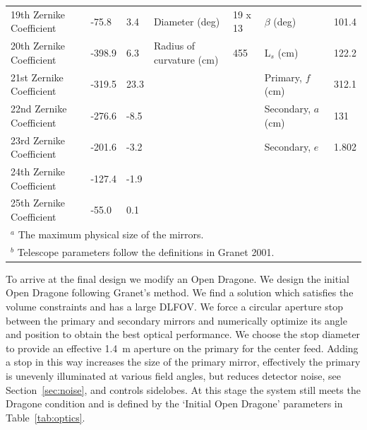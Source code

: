 \documentclass[]{spie}  %
\begin{document}
\begin{table}[ht]
\begin{adjustbox}{width=1.05\textwidth}
\begin{tabular}{|l|llll||ll|}
19th Zernike Coefficient  & -75.8             & 3.4               & Diameter (deg)            & 19 x 13  & $\beta$  (deg)                 & 101.4 \\   
20th Zernike Coefficient  & -398.9            & 6.3               & Radius of curvature (cm)  & 455      & L$_s$ (cm)                     & 122.2 \\   
21st Zernike Coefficient  & -319.5            & 23.3              &                           &          & Primary, $f$ (cm)              & 312.1 \\   
22nd Zernike Coefficient  & -276.6            & -8.5              &                           &          & Secondary, $a$ (cm)            & 131   \\   
23rd Zernike Coefficient  & -201.6            & -3.2              &                           &          & Secondary, $e$                 &  1.802  \\
24th Zernike Coefficient  & -127.4            & -1.9              &                           &          &                                &       \\
25th Zernike Coefficient  & -55.0             & 0.1               &                           &          &                                &       \\\hline
\multicolumn{7}{l}{\footnotesize  $^a$ The maximum physical size of the mirrors.}\\
\multicolumn{7}{l}{\footnotesize  $^b$ Telescope parameters follow the definitions in Granet 2001.\cite{granet2001}} \\
\end{tabular}
\end{adjustbox}
\end{table}

To arrive at the final design we modify an Open Dragone.  We design the initial Open Dragone following Granet's method\cite{granet2001}. 
We find a solution which satisfies the volume constraints and has a large DLFOV.  We force a circular aperture stop 
between the primary and secondary mirrors and numerically optimize its angle and position to obtain the best 
optical performance.  We choose the stop diameter to provide an effective 1.4~m aperture on the primary for the center feed.  
Adding a stop in this way increases the size of the primary mirror, effectively the primary is unevenly illuminated at various 
field angles, but reduces detector noise, see Section~\ref{sec:noise}, and controls sidelobes.  At this stage the system still meets 
the Dragone condition and is defined by the `Initial Open Dragone' parameters in Table~\ref{tab:optics}.
\end{document}
